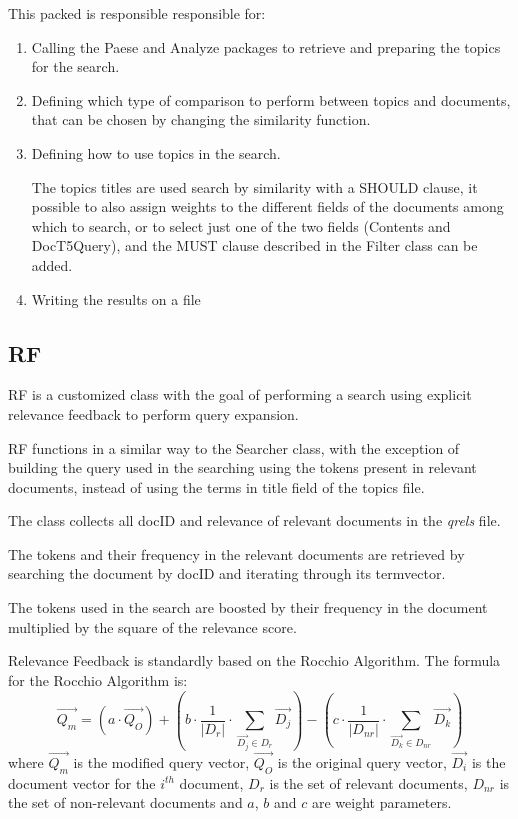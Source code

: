   This packed is responsible responsible for:
    \begin{enumerate}
    	\item Calling the Paese and Analyze packages to retrieve and preparing the topics for the search.
    	\item Defining which type of comparison to perform between topics and documents, that can be chosen by changing the similarity function.
    	\item Defining how to use topics in the search.
    	
    	The topics titles are used search by similarity with a SHOULD clause, it possible to also assign weights to the different fields of the documents among which to search, or to select just one of the two fields (Contents and DocT5Query), and the MUST clause described in the Filter class can be added.
    	\item Writing the results on a file
    \end{enumerate}

\subsection{RF}
        
        RF is a customized class with the goal of performing a search using explicit relevance feedback to perform query expansion.
        
        RF functions in a similar way to the Searcher class, with the exception of building the query used in the searching using the tokens present in relevant documents, instead of using the terms in title field of the topics file.
        
        The class collects all docID and relevance of relevant documents in the \textit{qrels} file.
        
        The tokens and their frequency in the relevant documents are retrieved by searching the document by docID and iterating through its termvector.
        
        The tokens used in the search are boosted by their frequency in the document multiplied by the square of the relevance score.
        
        Relevance Feedback is standardly based on the Rocchio Algorithm. \citep{Rocchio}
        The formula for the Rocchio Algorithm is:
        $$
        \overrightarrow{Q_{m}}=
        \left(a\cdot\overrightarrow{Q_{O}}\right)+
        \left(b\cdot\frac{1}{|D_{r}|}\cdot\sum_{\overrightarrow{D_{j}}\in D_{r}}\overrightarrow{D_{j}}\right)-
        \left(c\cdot\frac{1}{|D_{nr}|}\cdot\sum_{\overrightarrow{D_{k}}\in D_{nr}}\overrightarrow{D_{k}}\right)
        $$
        where $\overrightarrow{Q_{m}}$ is the modified query vector, $\overrightarrow{Q_{O}}$ is the original query vector, $\overrightarrow{D_{i}}$ is the document vector for the $i^{th}$ document, $D_{r}$ is the set of relevant documents, $D_{nr}$ is the set of non-relevant documents and $a$, $b$ and $c$ are weight parameters.
        
